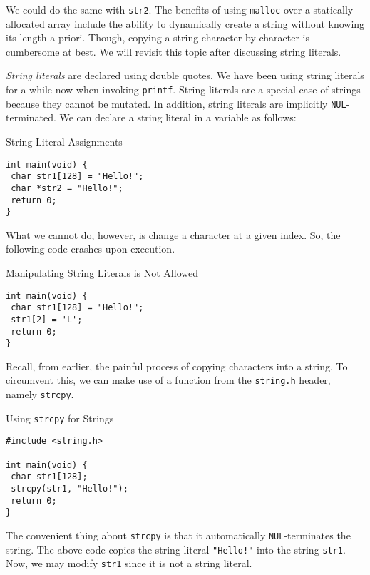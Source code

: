 We could do the same with \texttt{str2}. The benefits of using \texttt{malloc} over a statically-allocated array include the ability to dynamically create a string without knowing its length a priori. Though, copying a string character by character is cumbersome at best. We will revisit this topic after discussing string literals.

\textit{String literals} are declared using double quotes. We have been using string literals for a while now when invoking \texttt{printf}. String literals are a special case of strings because they cannot be mutated. In addition, string literals are implicitly \texttt{NUL}-terminated. We can declare a string literal in a variable as follows:

\begin{cl}[main.c]{String Literal Assignments}\begin{lstlisting}[language=MyC]
int main(void) {
 char str1[128] = "Hello!";
 char *str2 = "Hello!";
 return 0;
}
\end{lstlisting}\end{cl}

What we cannot do, however, is change a character at a given index. So, the following code crashes upon execution.

\begin{cl}[main.c]{Manipulating String Literals is Not Allowed}\begin{lstlisting}[language=MyC]
int main(void) {
 char str1[128] = "Hello!";
 str1[2] = 'L';
 return 0;
}
\end{lstlisting}\end{cl}

Recall, from earlier, the painful process of copying characters into a string. To circumvent this, we can make use of a function from the \texttt{string.h} header, namely \texttt{strcpy}. 

\begin{cl}[main.c]{Using \texttt{strcpy} for Strings}\begin{lstlisting}[language=MyC]
#include <string.h>

int main(void) {
 char str1[128];
 strcpy(str1, "Hello!");
 return 0;
}
\end{lstlisting}\end{cl}

The convenient thing about \texttt{strcpy} is that it automatically \texttt{NUL}-terminates the string. The above code copies the string literal \texttt{"Hello!"} into the string \texttt{str1}. Now, we may modify \texttt{str1} since it is not a string literal.

